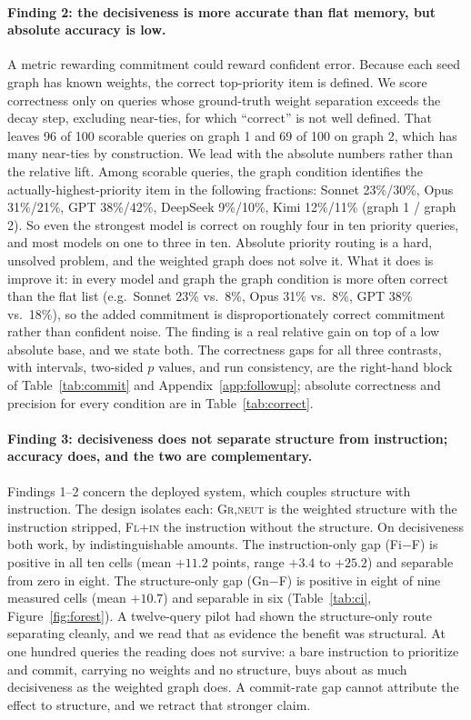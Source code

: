 \documentclass[11pt]{article}
\begin{document}
\paragraph{Finding 2: the decisiveness is more accurate than flat memory, but absolute accuracy is low.} A metric rewarding commitment could reward confident error. Because each seed graph has known weights, the correct top-priority item is defined. We score correctness only on queries whose ground-truth weight separation exceeds the decay step, excluding near-ties, for which ``correct'' is not well defined. That leaves 96 of 100 scorable queries on graph 1 and 69 of 100 on graph 2, which has many near-ties by construction. We lead with the absolute numbers rather than the relative lift. Among scorable queries, the graph condition identifies the actually-highest-priority item in the following fractions: Sonnet 23\%/30\%, Opus 31\%/21\%, GPT 38\%/42\%, DeepSeek 9\%/10\%, Kimi 12\%/11\% (graph 1 / graph 2). So even the strongest model is correct on roughly four in ten priority queries, and most models on one to three in ten. Absolute priority routing is a hard, unsolved problem, and the weighted graph does not solve it. What it does is improve it: in every model and graph the graph condition is more often correct than the flat list (e.g.\ Sonnet 23\% vs.\ 8\%, Opus 31\% vs.\ 8\%, GPT 38\% vs.\ 18\%), so the added commitment is disproportionately correct commitment rather than confident noise. The finding is a real relative gain on top of a low absolute base, and we state both. The correctness gaps for all three contrasts, with intervals, two-sided $p$ values, and run consistency, are the right-hand block of Table~\ref{tab:commit} and Appendix~\ref{app:followup}; absolute correctness and precision for every condition are in Table~\ref{tab:correct}.

\paragraph{Finding 3: decisiveness does not separate structure from instruction; accuracy does, and the two are complementary.} Findings 1--2 concern the deployed system, which couples structure with instruction. The design isolates each: \textsc{Gr,neut} is the weighted structure with the instruction stripped, \textsc{Fl+in} the instruction without the structure. On decisiveness both work, by indistinguishable amounts. The instruction-only gap (Fi$-$F) is positive in all ten cells (mean $+11.2$ points, range $+3.4$ to $+25.2$) and separable from zero in eight. The structure-only gap (Gn$-$F) is positive in eight of nine measured cells (mean $+10.7$) and separable in six (Table~\ref{tab:ci}, Figure~\ref{fig:forest}). A twelve-query pilot had shown the structure-only route separating cleanly, and we read that as evidence the benefit was structural. At one hundred queries the reading does not survive: a bare instruction to prioritize and commit, carrying no weights and no structure, buys about as much decisiveness as the weighted graph does. A commit-rate gap cannot attribute the effect to structure, and we retract that stronger claim.
\end{document}

